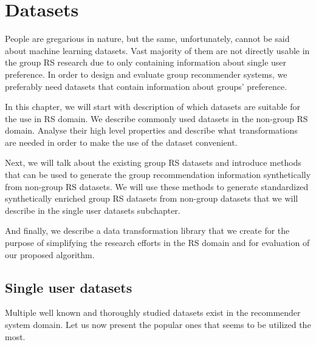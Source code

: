 

\chapter{Datasets}  \label{chap:datasets}
People are gregarious in nature, but the same, unfortunately, cannot be said about machine learning datasets. Vast majority of them are not directly usable in the group RS research due to only containing information about single user preference. In order to design and evaluate group recommender systems, we preferably need datasets that contain information about groups' preference.

In this chapter, we will start with description of which datasets are suitable for the use in RS domain. We describe commonly used datasets in the non-group RS domain. Analyse their high level properties and describe what transformations are needed in order to make the use of the dataset convenient. 

Next, we will talk about the existing group RS datasets and introduce methods that can be used to generate the group recommendation information synthetically from non-group RS datasets. We will use these methods to generate standardized synthetically enriched group RS datasets from non-group datasets that we will describe in the single user datasets subchapter.

And finally, we describe a data transformation library that we create for the purpose of simplifying the research efforts in the RS domain and for evaluation of our proposed algorithm.


\section{Single user datasets} \label{sec:single_user_datasets}
Multiple well known and thoroughly studied datasets exist in the recommender system domain. Let us now present the popular ones that seems to be utilized the most.

